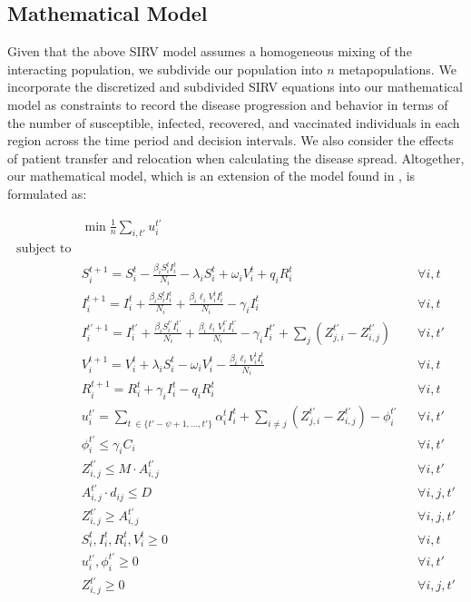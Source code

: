 \documentclass{article}
\begin{document}
\subsection{Mathematical Model}
Given that the above SIRV model assumes a homogeneous mixing of the interacting population, we subdivide our population into $n$ metapopulations. We incorporate the discretized and subdivided SIRV equations into our mathematical model as constraints to record the disease progression and behavior in terms of the number of susceptible, infected, recovered, and vaccinated individuals in each region across the time period and decision intervals. We also consider the effects of patient transfer and relocation when calculating the disease spread. Altogether, our mathematical model, which is an extension of the model found in \textcite{abazari2024allocation}, is formulated as:

\begin{align}
    & \min \frac{1}{n} \sum_{i,t'} u_i^{t'} \label{eq:objective} \\
    \text{subject to} \nonumber \\
    &S_i^{t+1} = S_i^t - \frac{\beta_i S_i^t I_i^t}{N_i} - \lambda_i S_i^t + \omega_i V_i^t + q_i R_i^t  && \forall i, t \label{eq:susceptible} \\
    & I_i^{t+1} = I_i^t + \frac{\beta_i S_i^t I_i^t}{N_i} + \frac{\beta_i \ell_i V_i^{t} I_i^t}{N_i} - \gamma_i I_i^t && \forall i, t \label{eq:infected} \\
    & I_i^{t'+1} = I_i^{t'} + \frac{\beta_i S_i^{t'} I_i^{t'}}{N_i} + \frac{\beta_i \ell_i V_i^{t'} I_i^{t'}}{N_i} - \gamma_i I_i^{t'} + \sum_j (Z_{j,i}^{t'} - Z_{i,j}^{t'}) && \forall i, t' \label{eq:infected_transfer} \\
    & V_i^{t+1} = V_i^t + \lambda_i S_i^{t} - \omega_i V_i^t - \frac{\beta_i \ell_i V_i^t I_i^t}{N_i} && \forall i,t \label{eq:vaccinated} \\
    & R_i^{t+1} = R_i^t + \gamma_i I_i^t - q_i R_i^t && \forall i,t \label{eq:recovered} \\
    & u_i^{t'} = \sum_{t\ \in \{t' - \psi + 1, \ldots, t'\}} \alpha_i^{t} I_i^t + \sum_{i \neq j} (Z_{j,i}^{t'} - Z_{i,j}^{t'}) - \phi_i^{t'} && \forall i,t' \label{eq:unmet_demand} \\
    & \phi_i^{t'} \leq \gamma_i C_i && \forall i,t' \label{eq:satisfied_demand} \\
    & Z_{i,j}^{t'} \leq M \cdot A_{i,j}^{t'} && \forall i,t' \label{eq:transfer_limit} \\
    & A_{i,j}^{t'} \cdot d_{ij} \leq D && \forall i,j,t' \label{eq:distance_limit} \\
    & Z_{i,j}^{t'} \geq A_{i,j}^{t'} && \forall i,j,t' \label{eq:binary_constraint} \\
    & S_i^t, I_i^t, R_i^t, V_i^t \geq 0 &&  \forall i, t \label{eq:nonnegativity} \\
    & u_i^{t'}, \phi_i^{t'} \geq 0 && \forall i, t' \label{eq:nonnegativity_2} \\
    & Z_{i,j}^{t'} \geq 0 && \forall i,j, t' \label{eq:nonnegativity_3}
\end{align}
\end{document}

